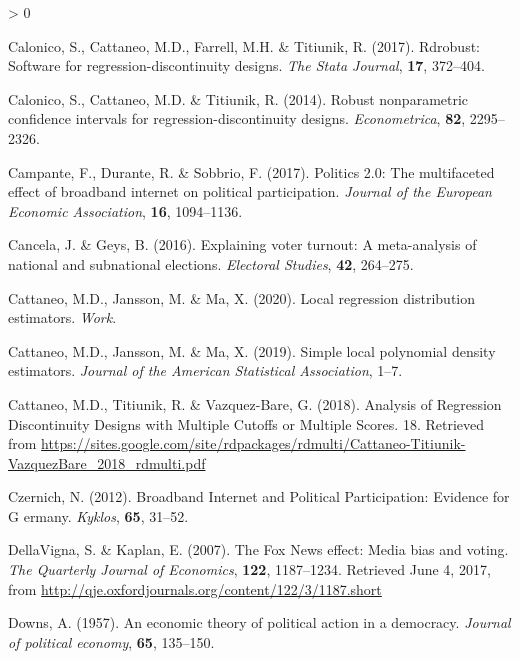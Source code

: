 \documentclass[
  12pt,
]{article}
\newlength{\cslhangindent}
\newenvironment{CSLReferences}[2] %
 {%
  \setlength{\parindent}{0pt}
  \ifodd #1 \everypar{\setlength{\hangindent}{\cslhangindent}}\ignorespaces\fi
  \ifnum #2 > 0
  \setlength{\parskip}{#2\baselineskip}
  \fi
 }%
 {}
\begin{document}
\begin{CSLReferences}{1}{0}
\leavevmode\hypertarget{ref-calonico_rdrobust_2017}{}%
Calonico, S., Cattaneo, M.D., Farrell, M.H. \& Titiunik, R. (2017).
Rdrobust: {Software} for regression-discontinuity designs. \emph{The
Stata Journal}, \textbf{17}, 372--404.

\leavevmode\hypertarget{ref-calonico_robust_2014}{}%
Calonico, S., Cattaneo, M.D. \& Titiunik, R. (2014). Robust
nonparametric confidence intervals for regression-discontinuity designs.
\emph{Econometrica}, \textbf{82}, 2295--2326.

\leavevmode\hypertarget{ref-campante_politics_2017}{}%
Campante, F., Durante, R. \& Sobbrio, F. (2017). Politics 2.0: {The}
multifaceted effect of broadband internet on political participation.
\emph{Journal of the European Economic Association}, \textbf{16},
1094--1136.

\leavevmode\hypertarget{ref-cancela_explaining_2016}{}%
Cancela, J. \& Geys, B. (2016). Explaining voter turnout: {A}
meta-analysis of national and subnational elections. \emph{Electoral
Studies}, \textbf{42}, 264--275.

\leavevmode\hypertarget{ref-cattaneo_local_2020}{}%
Cattaneo, M.D., Jansson, M. \& Ma, X. (2020). Local regression
distribution estimators. \emph{Work}.

\leavevmode\hypertarget{ref-cattaneo_simple_2019}{}%
Cattaneo, M.D., Jansson, M. \& Ma, X. (2019). Simple local polynomial
density estimators. \emph{Journal of the American Statistical
Association}, 1--7.

\leavevmode\hypertarget{ref-cattaneo_analysis_2018}{}%
Cattaneo, M.D., Titiunik, R. \& Vazquez-Bare, G. (2018). Analysis of
{Regression} {Discontinuity} {Designs} with {Multiple} {Cutoffs} or
{Multiple} {Scores}. 18. Retrieved from
\url{https://sites.google.com/site/rdpackages/rdmulti/Cattaneo-Titiunik-VazquezBare_2018_rdmulti.pdf}

\leavevmode\hypertarget{ref-czernich_broadband_2012}{}%
Czernich, N. (2012). Broadband {Internet} and {Political}
{Participation}: {Evidence} for {G} ermany. \emph{Kyklos}, \textbf{65},
31--52.

\leavevmode\hypertarget{ref-dellavigna_fox_2007}{}%
DellaVigna, S. \& Kaplan, E. (2007). The {Fox} {News} effect: {Media}
bias and voting. \emph{The Quarterly Journal of Economics},
\textbf{122}, 1187--1234. Retrieved June 4, 2017, from
\url{http://qje.oxfordjournals.org/content/122/3/1187.short}

\leavevmode\hypertarget{ref-downs_economic_1957}{}%
Downs, A. (1957). An economic theory of political action in a democracy.
\emph{Journal of political economy}, \textbf{65}, 135--150.


\end{CSLReferences}
\end{document}
